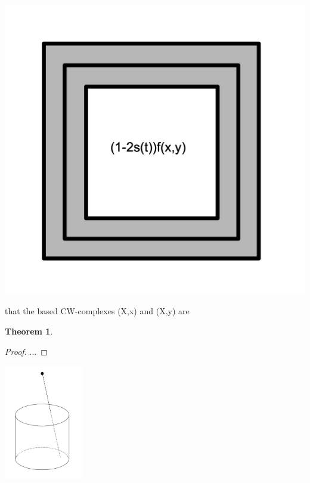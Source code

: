 \documentclass{book}
\theoremstyle{definition}
\newtheorem{theorem}{Theorem}
\begin{document}
\begin{center}
\includegraphics[scale=0.5]{windowframe.png}
\end{center}

that the based CW-complexes (X,x) and (X,y) are 

\begin{theorem}

\end{theorem}

\begin{proof}
...
\end{proof}

\begin{center}
\includegraphics[width=3.5cm,height=5cm]{proj.png}
\end{center}

 
\end{document}

